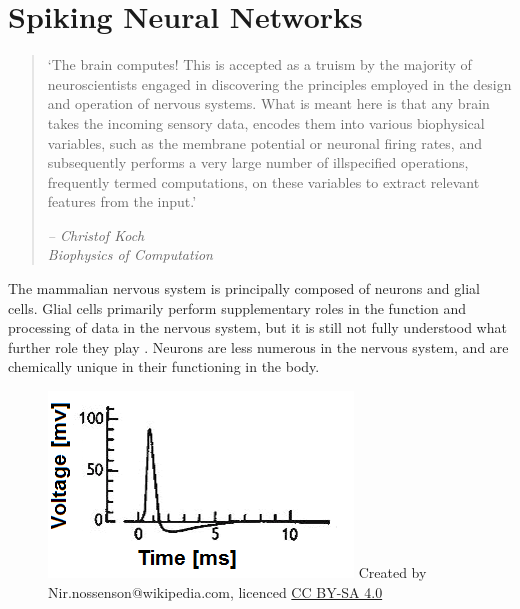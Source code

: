 \section{Spiking Neural Networks}

\begin{quote}
    `The brain computes! This is accepted as a truism by the majority
    of neuroscientists engaged in discovering the principles employed in the
    design and operation of nervous systems. What is meant here is that any
    brain takes the incoming sensory data, encodes them into various biophysical
    variables, such as the membrane potential or neuronal firing rates, and
    subsequently performs a very large number of illspecified operations,
    frequently termed computations, on these variables to extract relevant
    features from the input.'
    \begin{flushright}
        \textit{-- Christof Koch \\ Biophysics of Computation}
    \end{flushright}
\end{quote}

The mammalian nervous system is principally composed of neurons and glial cells.
Glial cells primarily perform supplementary roles in the function and processing
of data in the nervous system, but it is still not fully understood what further
role they play \autocite{walz_role_1989}. Neurons are less numerous in the
nervous system, and are chemically unique in their functioning in the body.

\begin{figure}[t]
    \centering
    \includegraphics{figures/graphs/huxhog_spike.png}
    {\small{Created by Nir.nossenson@wikipedia.com, licenced 
            \href{https://creativecommons.org/licenses/by-sa/4.0/deed.en}{CC BY-SA 4.0}}}
    \label{neuronalactionpotentialexample}
\end{figure}
\vspace{1ex}

